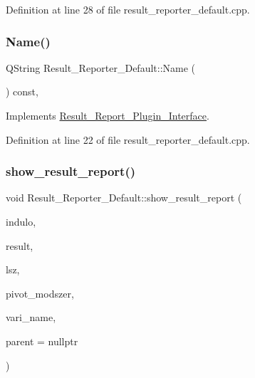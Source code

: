 Definition at line 28 of file result\+\_\+reporter\+\_\+default.\+cpp.

\mbox{\label{classResult__Reporter__Default_af1794a748e246ed0113e85e1f25e2907}} 
\subsubsection{\texorpdfstring{Name()}{Name()}}
{\footnotesize\ttfamily Q\+String Result\+\_\+\+Reporter\+\_\+\+Default\+::\+Name (\begin{DoxyParamCaption}{ }\end{DoxyParamCaption}) const\hspace{0.3cm}{\ttfamily [override]}, {\ttfamily [virtual]}}



Implements \hyperlink{classResult__Report__Plugin__Interface_ad86b327f9bebee3f52666abeea1ca03f}{Result\+\_\+\+Report\+\_\+\+Plugin\+\_\+\+Interface}.



Definition at line 22 of file result\+\_\+reporter\+\_\+default.\+cpp.

\mbox{\label{classResult__Reporter__Default_a0cd7068847fcea1f0f4a6ba82441c4c6}} 
\subsubsection{\texorpdfstring{show\+\_\+result\+\_\+report()}{show\_result\_report()}}
{\footnotesize\ttfamily void Result\+\_\+\+Reporter\+\_\+\+Default\+::show\+\_\+result\+\_\+report (\begin{DoxyParamCaption}\item[{Q\+Standard\+Item\+Model $\ast$}]{indulo,  }\item[{Q\+Standard\+Item\+Model $\ast$}]{result,  }\item[{int}]{lsz,  }\item[{Q\+String}]{pivot\+\_\+modszer,  }\item[{Q\+String}]{vari\+\_\+name,  }\item[{Q\+Widget $\ast$}]{parent = {\ttfamily nullptr} }\end{DoxyParamCaption})\hspace{0.3cm}{\ttfamily [virtual]}}



